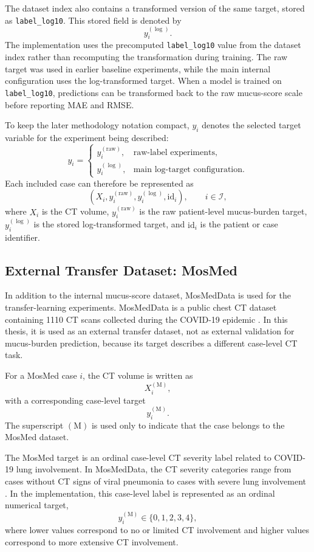 The dataset index also contains a transformed version of the same target, stored as \texttt{label\_log10}. This stored field is denoted by
\[
y_i^{(\log)}.
\]
The implementation uses the precomputed \texttt{label\_log10} value from the dataset index rather than recomputing the transformation during training. The raw target was used in earlier baseline experiments, while the main internal configuration uses the log-transformed target. When a model is trained on \texttt{label\_log10}, predictions can be transformed back to the raw mucus-score scale before reporting MAE and RMSE.

To keep the later methodology notation compact, \(y_i\) denotes the selected target variable for the experiment being described:
\[
y_i
=
\begin{cases}
y_i^{(\mathrm{raw})}, & \text{raw-label experiments},\\
y_i^{(\log)}, & \text{main log-target configuration}.
\end{cases}
\]
Each included case can therefore be represented as
\[
\left(X_i, y_i^{(\mathrm{raw})}, y_i^{(\log)}, \mathrm{id}_i\right),
\qquad i \in \mathcal{I},
\]
where \(X_i\) is the CT volume, \(y_i^{(\mathrm{raw})}\) is the raw patient-level mucus-burden target, \(y_i^{(\log)}\) is the stored log-transformed target, and \(\mathrm{id}_i\) is the patient or case identifier.



\subsection{External Transfer Dataset: MosMed}
\label{sec:external_transfer_dataset_mosmed}

In addition to the internal mucus-score dataset, MosMedData is used for the transfer-learning experiments. MosMedData is a public chest CT dataset containing 1110 CT scans collected during the COVID-19 epidemic \cite{morozov2020mosmeddata}. In this thesis, it is used as an external transfer dataset, not as external validation for mucus-burden prediction, because its target describes a different case-level CT task.

For a MosMed case \(i\), the CT volume is written as
\[
X_i^{(\mathrm{M})},
\]
with a corresponding case-level target
\[
y_i^{(\mathrm{M})}.
\]
The superscript \((\mathrm{M})\) is used only to indicate that the case belongs to the MosMed dataset.

The MosMed target is an ordinal case-level CT severity label related to COVID-19 lung involvement. In MosMedData, the CT severity categories range from cases without CT signs of viral pneumonia to cases with severe lung involvement \cite{morozov2020mosmeddata}. In the implementation, this case-level label is represented as an ordinal numerical target,
\[
y_i^{(\mathrm{M})} \in \{0,1,2,3,4\},
\]
where lower values correspond to no or limited CT involvement and higher values correspond to more extensive CT involvement.

